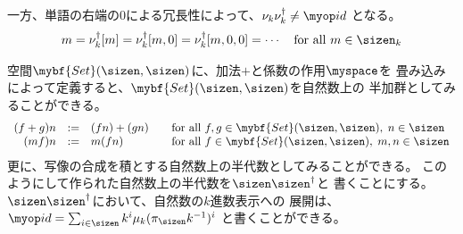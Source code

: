 	一方、単語の右端の$0$による冗長性によって、$\nu_k\nu_k^\dag\neq\id$
	となる。
	\begin{equation*}\begin{split}
		m = \nu_k^\dag[m] = \nu_k^\dag[m,0] = \nu_k^\dag[m,0,0] = \cdots
		\quad\text{for all }m\in\sizen_k
	\end{split}\end{equation*}

	\begin{note}[写像の空間でのk進数表示]\label{note:写像の空間でのk進数表示} %
		空間$\mybf{Set}(\sizen,\sizen)$に、加法$+$と係数の作用$\myspace$を
		畳み込みによって定義すると、$\mybf{Set}(\sizen,\sizen)$を自然数上の
		半加群としてみることができる。
		{\setlength\arraycolsep{2pt}\begin{equation*}\begin{array}{rcll}
			(f + g)n &:=& (fn) + (gn)
			&\quad\text{for all }f,g\in\mybf{Set}(\sizen,\sizen),\;n\in\sizen \\
			(mf)n &:=& m(fn)
			&\quad\text{for all }f\in\mybf{Set}(\sizen,\sizen),\;m,n\in\sizen \\
		\end{array}\end{equation*}}
		更に、写像の合成を積とする自然数上の半代数としてみることができる。
		このようにして作られた自然数上の半代数を$\sizen\sizen^\dag$と
		書くことにする。$\sizen\sizen^\dag$において、自然数の$k$進数表示への
		展開は、$\id = \sum_{i\in\sizen}k^i\mu_k(\pi_\sizen k^{-1})^i$
		と書くことができる。
	\end{note} %


